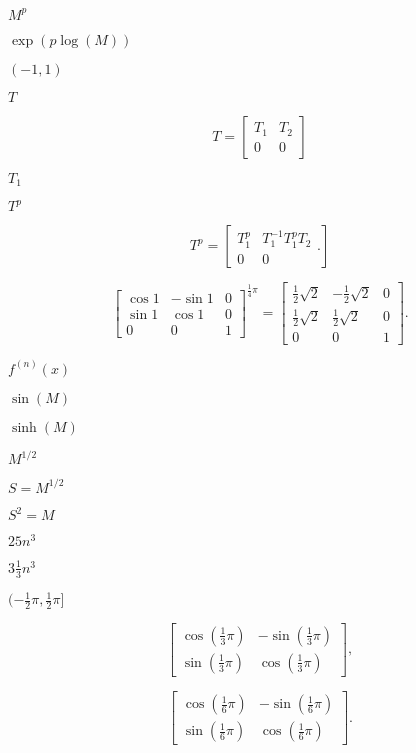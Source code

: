 \documentclass{article}
\begin{document}
$ M^p $
\pagebreak

$ \exp(p \log(M)) $
\pagebreak

$ (-1, 1) $
\pagebreak

$ T $
\pagebreak

\[ T = \left[ \begin{array}{cc} T_1 & T_2 \\ 0 & 0 \end{array} \right] \]
\pagebreak

$ T_1 $
\pagebreak

$ T^p $
\pagebreak

\[ T^p = \left[ \begin{array}{cc} T_1^p & T_1^{-1} T_1^p T_2 \\ 0 & 0 \end{array}. \right] \]
\pagebreak

\[ \left[ \begin{array}{ccc} \cos1 & -\sin1 & 0 \\ \sin1 & \cos1 & 0 \\ 0 & 0 & 1 \end{array} \right]^{\frac14\pi} = \left[ \begin{array}{ccc} \frac12\sqrt2 & -\frac12\sqrt2 & 0 \\ \frac12\sqrt2 & \frac12\sqrt2 & 0 \\ 0 & 0 & 1 \end{array} \right]. \]
\pagebreak

$ f^{(n)}(x) $
\pagebreak

$ \sin(M) $
\pagebreak

$ \sinh(M) $
\pagebreak

$ M^{1/2} $
\pagebreak

$ S = M^{1/2} $
\pagebreak

$ S^2 = M $
\pagebreak

$ 25 n^3 $
\pagebreak

$ 3\frac13 n^3 $
\pagebreak

$ (-\frac12\pi, \frac12\pi] $
\pagebreak

\[ \left[ \begin{array}{cc} \cos(\frac13\pi) & -\sin(\frac13\pi) \\ \sin(\frac13\pi) & \cos(\frac13\pi) \end{array} \right], \]
\pagebreak

\[ \left[ \begin{array}{cc} \cos(\frac16\pi) & -\sin(\frac16\pi) \\ \sin(\frac16\pi) & \cos(\frac16\pi) \end{array} \right]. \]
\pagebreak
\end{document}
